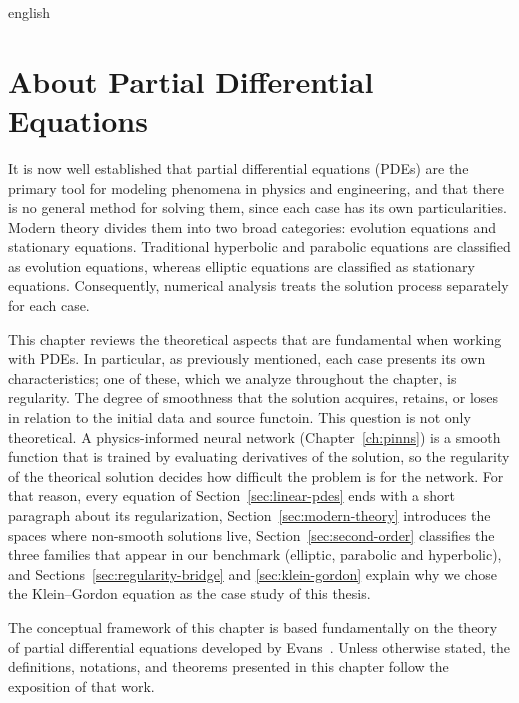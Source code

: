 
\begin{hyphenrules}{english}

\chapter{About Partial Differential Equations}\label{ch:pdes}

It is now well established that partial differential equations (PDEs) are the primary tool for
modeling phenomena in physics and engineering, and that there is no general method for solving them,
since each case has its own particularities. Modern theory divides them into two broad categories:
evolution equations and stationary equations. Traditional hyperbolic and parabolic equations are
classified as evolution equations, whereas elliptic equations are classified as stationary equations.
Consequently, numerical analysis treats the solution process separately for each case.

This chapter reviews the theoretical aspects that are fundamental when working with PDEs. 
In particular, as previously mentioned, each case presents its own characteristics; one of these, 
which we analyze throughout the chapter, is regularity. The degree of smoothness that the solution acquires, 
retains, or loses in relation to the initial data and source functoin. This question is not only theoretical. 
A physics-informed neural network (Chapter~\ref{ch:pinns}) is a smooth function that is trained by evaluating derivatives of the
solution, so the regularity of the theorical solution decides how difficult the problem
is for the network. For that reason, every equation of Section~\ref{sec:linear-pdes} ends with a short
paragraph about its regularization, Section~\ref{sec:modern-theory} introduces the spaces where non-smooth
solutions live, Section~\ref{sec:second-order} classifies the three families that appear in our benchmark
(elliptic, parabolic and hyperbolic), and Sections~\ref{sec:regularity-bridge} and \ref{sec:klein-gordon} explain why we
chose the Klein--Gordon equation as the case study of this thesis.

The conceptual framework of this chapter is based fundamentally on the theory of partial differential
equations developed by Evans~\cite{evans2010}. Unless otherwise stated, the definitions, notations, and
theorems presented in this chapter follow the exposition of that work.


\end{hyphenrules}

